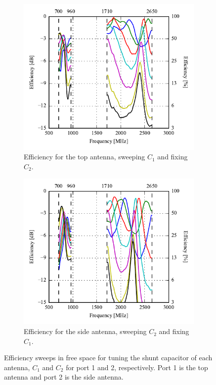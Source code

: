 \begin{figure}[htbp]
   \begin{subfigure}[b]{0.49\linewidth}
        \centering
        \includegraphics{img/tech_sol/monopole/prototype_v2/meas_efficiency_top}
        \caption{Efficiency for the top antenna, sweeping $C_1$ and fixing $C_2$.}
        \label{fig:ant1_proto_meas_topeff}
    \end{subfigure}
    \hfill
    \begin{subfigure}[b]{0.49\linewidth}
        \centering
        \includegraphics{img/tech_sol/monopole/prototype_v2/meas_efficiency_side}
        \caption{Efficiency for the side antenna, sweeping $C_2$ and fixing $C_1$.}
        \label{fig:ant1_proto_meas_sideeff}
    \end{subfigure}
    \caption{Efficiency sweeps in free space for tuning the shunt capacitor of each antenna, $C_1$ and $C_2$ for port 1 and 2, respectively. Port 1 is the top antenna and port 2 is the side antenna.}
    \label{fig:eff_mono_proto_meas}
\end{figure}

